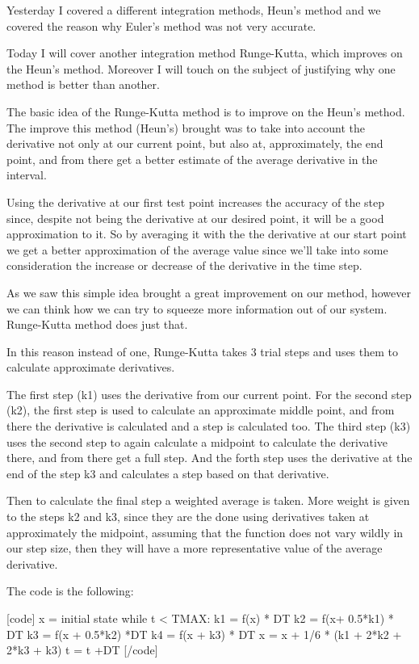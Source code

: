 Yesterday I covered a different integration methods, Heun's method and we covered the reason why Euler's method was not very accurate.

Today I will cover another integration method Runge-Kutta, which improves on the Heun's method. Moreover I will touch on the subject of justifying why one method is better than another.

The basic idea of the Runge-Kutta method is to improve on the Heun's method.
The improve this method (Heun's) brought was to take into account the derivative not only at our current point, but also at, approximately, the end point, and from there get a better estimate of the average derivative in the interval.

Using the derivative at our first test point increases the accuracy of the step since, despite not being the derivative at our desired point, it will be a good approximation to it. So by averaging it with the the derivative at our start point we get a better approximation of the average value since we'll take into some consideration the increase or decrease of the derivative in the time step.

As we saw this simple idea brought a great improvement on our method, however we can think how we can try to squeeze more information out of our system. Runge-Kutta method does just that.

In this reason instead of one, Runge-Kutta takes 3 trial steps and uses them to calculate approximate derivatives.

The first step (k1) uses the derivative from our current point. For the second step (k2), the first step is used to calculate an approximate middle point, and from there the derivative is calculated and a step is calculated too. The third step (k3) uses the second step to again calculate a midpoint to calculate the derivative there, and from there get a full step. And the forth step uses the derivative at the end of the step k3 and calculates a step based on that derivative.

Then to calculate the final step a weighted average is taken. More weight is given to the steps k2 and k3, since they are the done using derivatives taken at approximately the midpoint, assuming that the function does not vary wildly in our step size, then they will have a more representative value of the average derivative.

The code is the following:

[code]
x = initial state
while t < TMAX:
    k1 = f(x) * DT
    k2 = f(x+ 0.5*k1) * DT
    k3 = f(x + 0.5*k2) *DT
    k4 = f(x + k3) * DT
    x = x + 1/6 * (k1 + 2*k2 + 2*k3 + k3)
    t = t +DT
[/code]

